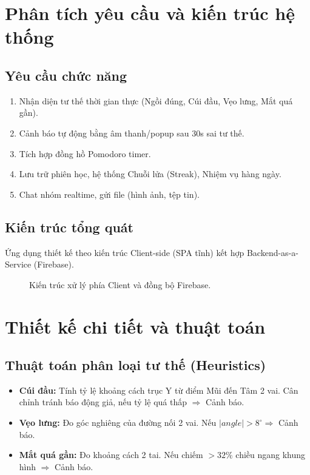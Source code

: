 \documentclass[12pt,a4paper]{article}
\begin{document}
\newpage
\section{Phân tích yêu cầu và kiến trúc hệ thống}
\subsection{Yêu cầu chức năng}
\begin{enumerate}[leftmargin=*]
    \item Nhận diện tư thế thời gian thực (Ngồi đúng, Cúi đầu, Vẹo lưng, Mắt quá gần).
    \item Cảnh báo tự động bằng âm thanh/popup sau 30s sai tư thế.
    \item Tích hợp đồng hồ Pomodoro timer.
    \item Lưu trữ phiên học, hệ thống Chuỗi lửa (Streak), Nhiệm vụ hàng ngày.
    \item Chat nhóm realtime, gửi file (hình ảnh, tệp tin).
\end{enumerate}

\subsection{Kiến trúc tổng quát}
Ứng dụng thiết kế theo kiến trúc Client-side (SPA tĩnh) kết hợp Backend-as-a-Service (Firebase).
\begin{figure}[H]
    \centering
    \caption{Kiến trúc xử lý phía Client và đồng bộ Firebase.}
\end{figure}

\section{Thiết kế chi tiết và thuật toán}
\subsection{Thuật toán phân loại tư thế (Heuristics)}
\begin{itemize}
    \item \textbf{Cúi đầu:} Tính tỷ lệ khoảng cách trục Y từ điểm Mũi đến Tâm 2 vai. Cân chỉnh tránh báo động giả, nếu tỷ lệ quá thấp $\Rightarrow$ Cảnh báo.
    \item \textbf{Vẹo lưng:} Đo góc nghiêng của đường nối 2 vai. Nếu $|angle| > 8^\circ \Rightarrow$ Cảnh báo.
    \item \textbf{Mắt quá gần:} Đo khoảng cách 2 tai. Nếu chiếm $> 32\%$ chiều ngang khung hình $\Rightarrow$ Cảnh báo.
\end{itemize}
\end{document}
